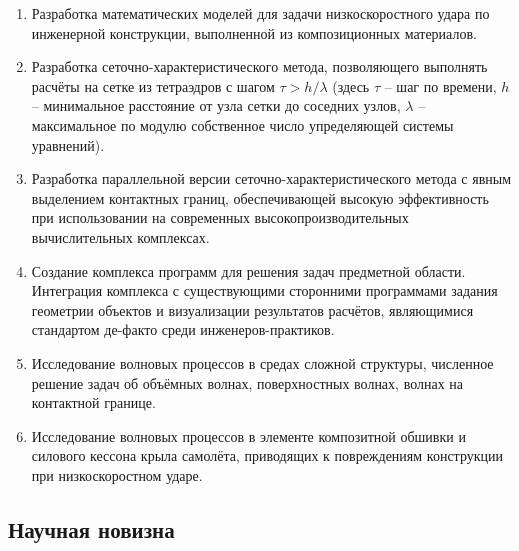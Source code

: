 \begin{enumerate}
\item Разработка математических моделей для задачи низкоскоростного удара по инженерной конструкции, выполненной из композиционных материалов.
\item Разработка сеточно-характеристического метода, позволяющего выполнять расчёты на сетке из тетраэдров с шагом $\tau > h / \lambda$ (здесь $\tau$ -- шаг по времени, $h$ -- минимальное расстояние от узла сетки до соседних узлов, $\lambda$ -- максимальное по модулю собственное число упределяющей системы уравнений).
\item Разработка параллельной версии сеточно-характеристического метода с явным выделением контактных границ, обеспечивающей высокую эффективность при использовании на современных высокопроизводительных вычислительных комплексах.
\item Создание комплекса программ для решения задач предметной области. Интеграция комплекса с существующими сторонними программами задания геометрии объектов и визуализации результатов расчётов, являющимися стандартом де-факто среди инженеров-практиков.
\item Исследование волновых процессов в средах сложной структуры, численное решение задач об объёмных волнах, поверхностных волнах, волнах на контактной границе.
\item Исследование волновых процессов в элементе композитной обшивки и силового кессона крыла самолёта, приводящих к повреждениям конструкции при низкоскоростном ударе.
\end{enumerate}

\subsection*{Научная новизна}

